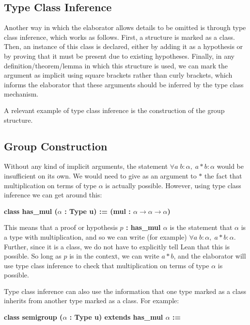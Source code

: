 \documentclass[runningheads,a4paper]{llncs}
\renewcommand{\a}{\alpha}
\renewcommand{\-}{\setminus}
\begin{document}
\subsection{Type Class Inference}

Another way in which the elaborator allows details to be omitted is through type class inference, which works as follows. First, a structure is marked as a class. Then, an instance of this class is declared, either by adding it as a hypothesis or by proving that it must be present due to existing hypotheses. Finally, in any definition/theorem/lemma in which this structure is used, we can mark the argument as implicit using square brackets rather than curly brackets, which informs the elaborator that these arguments should be inferred by the type class mechanism.

A relevant example of type class inference is the construction of the group structure.

\subsection{Group Construction}

Without any kind of implicit arguments, the statement $\forall a\; b : \a,\; a*b : \a$ would be insufficient on its own. We would need to give as an argument to $*$ the fact that multiplication on terms of type $\a$ is actually possible. However, using type class inference we can get around this:

\vspace{2 mm}
\hspace{2 em}\textbf{class has\_mul ($\a$ : Type u) := (mul : $\a \to \a \to \a$)}
\vspace{2 mm}

This means that a proof or hypothesis \textbf{$p$ : has\_mul $\a$} is the statement that $\a$ is a type with multiplication, and so we can write (for example) $\forall a\; b : \a,\; a*b : \a$. Further, since it is a class, we do not have to explicitly tell Lean that this is possible. So long as $p$ is in the context, we can write $a * b$, and the elaborator will use type class inference to check that multiplication on terms of type $\a$ is possible.

Type class inference can also use the information that one type marked as a class inherits from another type marked as a class. For example:

\vspace{2 mm}
\hspace{2 em}\textbf{class semigroup ($\a$ : Type u) extends has\_mul $\a$
 := }
\end{document}
